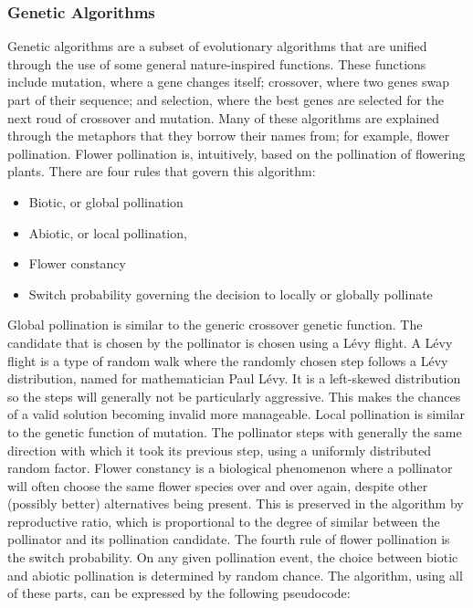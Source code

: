 \documentclass{article}
\begin{document}
    \subsubsection{Genetic Algorithms}
    Genetic algorithms are a subset of evolutionary algorithms that are unified through the use of some general nature-inspired functions. These
    functions include mutation, where a gene changes itself; crossover, where two genes swap part of their sequence; and selection, where the 
    best genes are selected for the next roud of crossover and mutation. Many of these algorithms are explained through the metaphors that they 
    borrow their names from; for example, flower pollination. Flower pollination is, intuitively, based on the pollination of flowering plants. 
    There are four rules that govern this algorithm:
    \begin{itemize}
        \item Biotic, or global pollination
        \item Abiotic, or local pollination, 
        \item Flower constancy
        \item Switch probability governing the decision to locally or globally pollinate
    \end{itemize}
    Global pollination is similar to the generic crossover genetic function. The candidate that is chosen by the pollinator is chosen using 
    a L\'evy flight. A L\'evy flight is a type of random walk where the randomly chosen step follows a L\'evy distribution, named for 
    mathematician Paul L\'evy. It is a left-skewed distribution so the steps will generally not be particularly aggressive. This makes the 
    chances of a valid solution becoming invalid more manageable. 
    Local pollination is similar to the genetic function of mutation. The pollinator steps with generally the same direction with which it 
    took its previous step, using a uniformly distributed random factor.
    Flower constancy is a biological phenomenon where a pollinator will often choose the same flower species over and over again, despite 
    other (possibly better) alternatives being present. This is preserved in the algorithm by reproductive ratio, which is proportional
    to the degree of similar between the pollinator and its pollination candidate. 
    The fourth rule of flower pollination is the switch probability. On any given pollination event, the choice between biotic and abiotic
    pollination is determined by random chance. The algorithm, using all of these parts, can be expressed by the following pseudocode:
\end{document}
